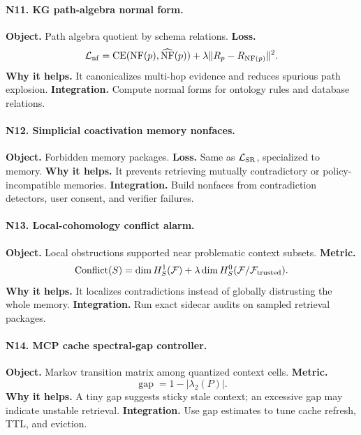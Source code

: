 \documentclass[11pt]{article}
\newcommand{\calF}{\mathcal{F}}
\newcommand{\loss}{\mathcal{L}}
\numberwithin{equation}{section}
\begin{document}
\paragraph{N11. KG path-algebra normal form.}
\textbf{Object.} Path algebra quotient by schema relations. \textbf{Loss.}
\begin{equation}
\loss_{\rm nf}=\operatorname{CE}(\operatorname{NF}(p),\widehat{\operatorname{NF}}(p))+\lambda\|R_p-R_{\operatorname{NF}(p)}\|^2.
\end{equation}
\textbf{Why it helps.} It canonicalizes multi-hop evidence and reduces spurious path explosion. \textbf{Integration.} Compute normal forms for ontology rules and database relations.

\paragraph{N12. Simplicial coactivation memory nonfaces.}
\textbf{Object.} Forbidden memory packages. \textbf{Loss.} Same as $\loss_{\rm SR}$, specialized to memory. \textbf{Why it helps.} It prevents retrieving mutually contradictory or policy-incompatible memories. \textbf{Integration.} Build nonfaces from contradiction detectors, user consent, and verifier failures.

\paragraph{N13. Local-cohomology conflict alarm.}
\textbf{Object.} Local obstructions supported near problematic context subsets. \textbf{Metric.}
\begin{equation}
\operatorname{Conflict}(S)=\dim H^1_S(\calF)+\lambda\dim H^0_S(\calF/\calF_{\rm trusted}).
\end{equation}
\textbf{Why it helps.} It localizes contradictions instead of globally distrusting the whole memory. \textbf{Integration.} Run exact sidecar audits on sampled retrieval packages.

\paragraph{N14. MCP cache spectral-gap controller.}
\textbf{Object.} Markov transition matrix among quantized context cells. \textbf{Metric.}
\begin{equation}
\operatorname{gap}=1-|\lambda_2(P)|.
\end{equation}
\textbf{Why it helps.} A tiny gap suggests sticky stale context; an excessive gap may indicate unstable retrieval. \textbf{Integration.} Use gap estimates to tune cache refresh, TTL, and eviction.
\end{document}
